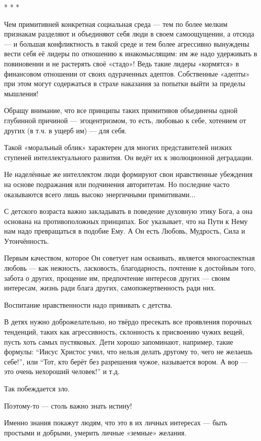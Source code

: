\begin{itemize}
* * *

Чем примитивней конкретная социальная среда — тем по более мелким признакам
разделяют и объединяют себя люди в своем самоощущении, а отсюда — и большая
конфликтность в такой среде и тем более агрессивно вынуждены вести себя её
лидеры по отношению к инакомыслящим: им же надо удерживать в повиновении и не
растерять своё «стадо»! Ведь такие лидеры «кормятся» в финансовом отношении от
своих одураченных адептов. Собственные «адепты» при этом могут содержаться в
страхе наказания за попытки выйти за пределы мышления!

Обращу внимание, что все принципы таких примитивов объединены одной глубинной
причиной — эгоцентризмом, то есть, любовью к себе, хотением от других (в т.ч. в
ущерб им) — для себя.

Такой «моральный облик» характерен для многих представителей низких ступеней
интеллектуального развития. Он ведёт их к эволюционной деградации.

Не наделённые же интеллектом люди формируют свои нравственные убеждения на
основе подражания или подчинения авторитетам. Но последние часто оказываются
всего лишь высоко энергичными примитивами...

С детского возраста важно закладывать в поведение духовную этику Бога, а она
основана на противоположных принципах. Бог указывает, что на Пути к Нему нам
надо превращаться в подобие Ему. А Он есть Любовь, Мудрость, Сила и
Утончённость.

Первым качеством, которое Он советует нам осваивать, является многоаспектная
любовь — как нежность, ласковость, благодарность, почтение к достойным того,
забота о других, прощение им, предпочтение интересов других — своим интересам,
жизнь ради блага других, самопожертвенность ради них.

Воспитание нравственности надо прививать с детства.

В детях нужно доброжелательно, но твёрдо пресекать все проявления порочных
тенденций, таких как агрессивность, склонность к присвоению чужих вещей, пусть
хоть самых пустяковых. Дети хорошо запоминают, например, такие формулы: \enquote{Иисус
Христос учил, что нельзя делать другому то, чего не желаешь себе!}, или \enquote{Тот,
кто берёт без разрешения чужое, называется вором. А вор — это очень нехороший
человек!} и т.д.

Так побеждается зло.

Поэтому-то — столь важно знать истину!

Именно знания покажут людям, что это в их личных интересах — быть простыми и
добрыми, умерить личные «земные» желания.


\end{itemize}
